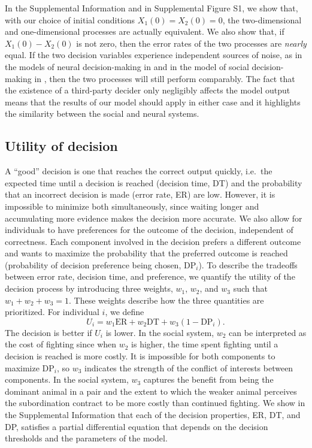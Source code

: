 \documentclass{pnastwo}
\begin{document}
\begin{article}
In the Supplemental Information and in Supplemental Figure S1, we show that, with our choice of initial conditions $X_1(0)=X_2(0)=0$, the two-dimensional and one-dimensional processes are actually equivalent. We also show that, if $X_1(0)-X_2(0)$ is not zero, then the error rates of the two processes are \emph{nearly} equal. If the two decision variables experience independent sources of noise, as in the models of neural decision-making in \cite{Feng:2009kl,Brown:2005fk,Bogacz:2006uq} and in the model of social decision-making in \cite{Froment:2010fk}, then the two processes will still perform comparably. The fact that the existence of a third-party decider only negligibly affects the model output means that the results of our model should apply in either case and it highlights the similarity between the social and neural systems. 

\subsection{Utility of decision}
A ``good'' decision is one that reaches the correct output quickly, i.e.\ the expected time until a decision is reached (decision time, DT) and the probability that an incorrect decision is made (error rate, ER) are low.  However, it is impossible to minimize both simultaneously, since waiting longer and accumulating more evidence makes the decision more accurate. We also allow for individuals to have preferences for the outcome of the decision, independent of correctness.  Each component involved in the decision prefers a different outcome and wants to maximize the probability that the preferred outcome is reached (probability of decision preference being chosen, $\text{DP}_i$). 
To describe the tradeoffs between error rate, decision time, and preference, we quantify the utility of the decision process by introducing three weights, $w_1$, $w_2$, and $w_3$ such that $w_1+w_2+w_3=1$.  These weights describe how the three quantities are prioritized.  For individual $i$, we define
\begin{equation*}
U_{i}=w_1\text{ER}+w_2\text{DT}+w_3(1-\text{DP}_i).
\end{equation*}
The decision is better if $U_i$ is lower.  
In the social system, $w_2$ can be interpreted as the cost of fighting since when $w_2$ is higher, the time spent fighting until a decision is reached is more costly.  It is impossible for  both components to maximize $\text{DP}_i$, so $w_3$ indicates the strength of the conflict of interests between components. In the social system, $w_3$ captures the benefit from being the dominant animal in a pair and the extent to which the weaker animal perceives the subordination contract to be more costly than continued fighting. We show in the Supplemental Information that each of the decision properties, ER, DT, and DP, satisfies a partial differential equation that depends on the decision thresholds and the parameters of the model. 


\end{article}
\end{document}
